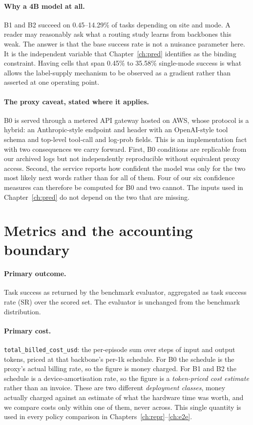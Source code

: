 \paragraph{Why a 4B model at all.} B1 and B2 succeed on 0.45--14.29\% of tasks
depending on site and mode. A reader may reasonably ask what a routing study
learns from backbones this weak. The answer is that the base success rate is not a nuisance parameter here. It is the independent variable that
Chapter~\ref{ch:pred} identifies as the binding constraint. Having cells that
span 0.45\% to 35.58\% single-mode success is what allows the label-supply
mechanism to be observed as a gradient rather than asserted at one operating
point.

\paragraph{The proxy caveat, stated where it applies.} B0 is served through a
metered API gateway hosted on AWS, whose protocol is a hybrid: an
Anthropic-style endpoint and header with an OpenAI-style tool schema and
top-level tool-call and log-prob fields. This is an implementation fact with two consequences we carry forward.
First, B0 conditions are replicable from our archived logs but not
independently reproducible without equivalent proxy access. Second, the
service reports how confident the model was only for the two most likely next
words rather than for all of them. Four of our six confidence measures can
therefore be computed for B0 and two cannot. The inputs used in
Chapter~\ref{ch:pred} do not depend on the two that are missing.

\FloatBarrier
\section{Metrics and the accounting boundary}
\label{sec:metrics}

\paragraph{Primary outcome.} Task success as returned by the benchmark
evaluator, aggregated as task success rate (SR) over the scored set. The
evaluator is unchanged from the benchmark distribution.

\paragraph{Primary cost.} \texttt{total\_billed\_cost\_usd}: the per-episode sum
over steps of input and output tokens, priced at that backbone's per-1k
schedule. For B0 the schedule is the proxy's actual billing rate, so the figure
is money charged. For B1 and B2 the schedule is a device-amortisation rate, so
the figure is a \emph{token-priced cost estimate} rather than an invoice.
These are two different \emph{deployment classes}, money actually charged
against an estimate of what the hardware time was worth, and we compare costs
only within one of them, never across. This single quantity is used in every
policy comparison in Chapters~\ref{ch:repr}--\ref{ch:e2e}.

